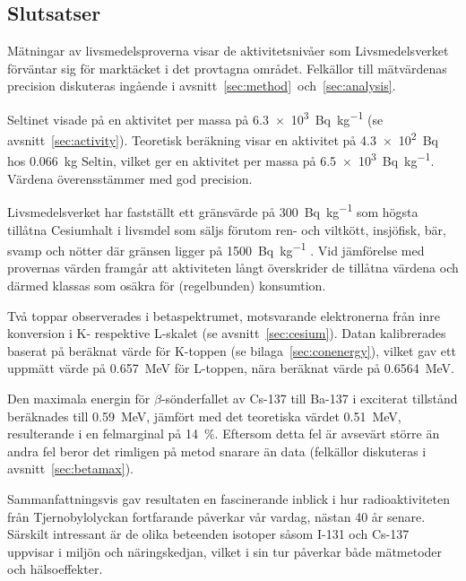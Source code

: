 \subsection{Slutsatser} \label{sec:conclusions}

Mätningar av livsmedelsproverna visar de aktivitetsnivåer som Livsmedelsverket
\parencite{livsmedelsverket} förväntar sig för marktäcket i det provtagna
området. Felkällor till mätvärdenas precision diskuteras ingående i
avsnitt~\ref{sec:method}~och~\ref{sec:analysis}.

Seltinet visade på en aktivitet per massa på \qty{6.3e3}{\becquerel\per\kg}
(se avsnitt~\ref{sec:activity}). Teoretisk beräkning visar en aktivitet på
\qty{4.3e2}{\becquerel} hos \qty{0.066}{\kg} Seltin, vilket ger en aktivitet
per massa på \qty{6.5e3}{\becquerel\per\kg}. Värdena överensstämmer med god
precision.

Livsmedelsverket har fastställt ett gränsvärde på \qty{300}{\becquerel\per\kg} 
som högsta tillåtna Cesiumhalt i livsmdel som säljs förutom ren- och viltkött,
insjöfisk, bär, svamp och nötter där gränsen ligger på
\qty{1500}{\becquerel\per\kg} \parencite{livsmedelsverket}. Vid jämförelse
med provernas värden framgår att aktiviteten långt överskrider de tillåtna
värdena och därmed klassas som osäkra för (regelbunden) konsumtion.

Två toppar observerades i betaspektrumet, motsvarande elektronerna från inre
konversion i K- respektive L-skalet (se avsnitt~\ref{sec:cesium}). Datan
kalibrerades baserat på beräknat värde för K-toppen (se
bilaga~\ref{sec:conenergy}), vilket gav ett uppmätt värde på \qty{0.657}{\MeV}
för L-toppen, nära beräknat värde på \qty{0.6564}{\MeV}.

Den maximala energin för $\beta$-sönderfallet av Cs-137 till Ba-137 i exciterat
tillstånd beräknades till \qty{0.59}{\MeV}, jämfört med det teoretiska värdet
\qty{0.51}{\MeV}, resulterande i en felmarginal på \qty{14}{\percent}. Eftersom
detta fel är avsevärt större än andra fel beror det rimligen på metod snarare
än data (felkällor diskuteras i avsnitt~\ref{sec:betamax}).

Sammanfattningsvis gav resultaten en fascinerande inblick i hur
radioaktiviteten från Tjernobylolyckan fortfarande påverkar vår vardag, nästan
\num{40} år senare. Särskilt intressant är de olika beteenden isotoper såsom
I-131 och Cs-137 uppvisar i miljön och näringskedjan, vilket i sin tur påverkar
både mätmetoder och hälsoeffekter.
